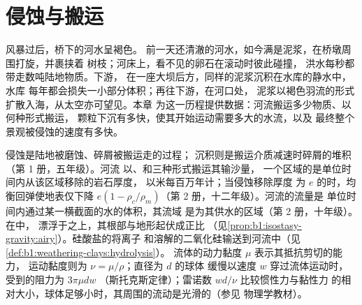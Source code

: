 \chapter{侵蚀与搬运}\label{ch:b1:erosion-transport}

风暴过后，桥下的河水呈褐色。
前一天还清澈的河水，如今满是泥浆，在桥墩周围打旋，并裹挟着
树枝；河床上，看不见的卵石在滚动时彼此碰撞，
洪水每秒都带走数吨陆地物质。下游，
在一座大坝后方，同样的泥浆沉积在水库的静水中，水库
每年都会损失一小部分体积；再往下游，在河口处，
泥浆以褐色羽流的形式扩散入海，从太空亦可望见。本章
为这一历程提供数据：河流搬运多少物质、以何种形式搬运，
颗粒下沉有多快，使其开始运动需要多大的水流，以及
最终整个景观被侵蚀的速度有多快。

\begin{recall}
侵蚀是陆地被磨蚀、碎屑被搬运走的过程；
沉积则是搬运介质减速时碎屑的堆积（第 1 册，五年级）。河流
以、和三种形式搬运其输沙量，
一个区域的是单位时间内从该区域移除的岩石厚度，
以米每百万年计；当侵蚀移除厚度
为 $e$ 的时，均衡回弹使地表仅下降 
$e(1 - \rho_c/\rho_m)$（第 2 册，十二年级）。河流的流量是
单位时间内通过某一横截面的水的体积，其流域
是为其供水的区域（第 2 册，十年级）。在中，
漂浮于之上，其根部与地形起伏成正比
（见\cref{prop:b1:isostasy-gravity:airy}）。硅酸盐的将离子
和溶解的二氧化硅输送到河流中（见\cref{def:b1:weathering-clays:hydrolysis}）。
流体的动力黏度 $\mu$ 表示其抵抗剪切的能力，
运动黏度则为 $\nu = \mu/\rho$；直径为 $d$ 的球体
缓慢以速度 $w$ 穿过流体运动时，受到的阻力为 $3\pi\mu d w$
（斯托克斯定律）；雷诺数 $w d/\nu$ 比较惯性力与黏性力
的相对大小，球体足够小时，其周围的流动是光滑的（参见
物理学教材）。
\end{recall}

